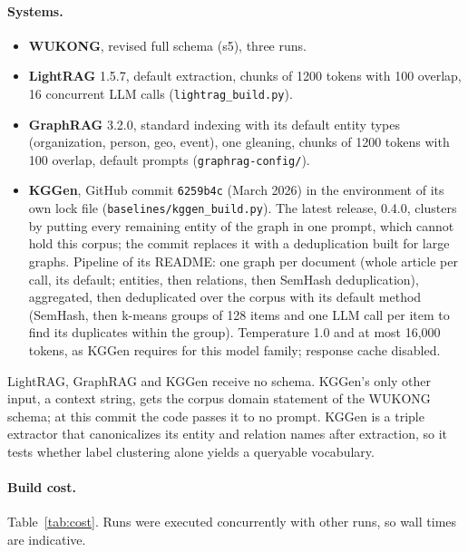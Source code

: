 \documentclass[11pt]{article}
\newcommand{\code}[1]{\texttt{#1}}
\newcommand{\wk}{WUKONG}
\begin{document}
\paragraph{Systems.}
\begin{itemize}
  \item \textbf{\wk}, revised full schema (s5), three runs.
  \item \textbf{LightRAG} 1.5.7, default extraction, chunks of 1200 tokens with 100 overlap,
    16 concurrent LLM calls (\code{lightrag\_build.py}).
  \item \textbf{GraphRAG} 3.2.0, standard indexing with its default entity types
    (organization, person, geo, event), one gleaning, chunks of 1200 tokens with 100 overlap,
    default prompts (\code{graphrag-config/}).
  \item \textbf{KGGen}, GitHub commit \code{6259b4c} (March 2026) in the environment of its own
    lock file (\code{baselines/kggen\_build.py}). The latest release, 0.4.0, clusters by putting
    every remaining entity of the graph in one prompt, which cannot hold this corpus; the commit
    replaces it with a deduplication built for large graphs. Pipeline of its README: one graph per
    document (whole article per call, its default; entities, then relations, then SemHash
    deduplication), aggregated, then deduplicated over the corpus with its default method
    (SemHash, then k-means groups of 128 items and one LLM call per item to find its duplicates
    within the group). Temperature 1.0 and at most 16,000 tokens, as KGGen requires for this model
    family; response cache disabled.
\end{itemize}
LightRAG, GraphRAG and KGGen receive no schema. KGGen's only other input, a context string, gets the
corpus domain statement of the \wk{} schema; at this commit the code passes it to no prompt.
KGGen is a triple extractor that canonicalizes its entity and relation names after extraction, so it
tests whether label clustering alone yields a queryable vocabulary.

\paragraph{Build cost.} Table~\ref{tab:cost}. Runs were executed concurrently with other runs, so
wall times are indicative.
\end{document}
